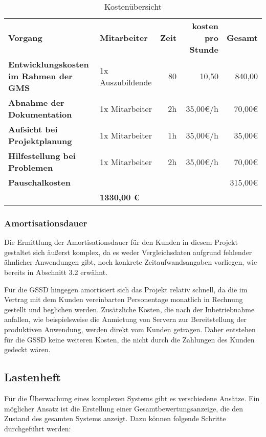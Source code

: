 \begin{flushleft}
	\begin{table}[h]
		\centering
		\begin{tabular}{ >{\bfseries}l l r r r }
			\rowcolor[HTML]{127017}
		\textbf{\color{white}Vorgang} & \textbf{\color{white}Mitarbeiter} & \textbf{\color{white}Zeit} & \textbf{\color{white}kosten pro Stunde} & \textbf{\color{white}Gesamt} \\
		Entwicklungskosten im Rahmen der GMS & 1x Auszubildende & 80 & 10,50 & 840,00 \\
		\rowcolor[HTML]{e1efd9}
		Abnahme der Dokumentation & 1x Mitarbeiter & 2h & 35,00€/h & 70,00€ \\
		Aufsicht bei Projektplanung & 1x Mitarbeiter & 1h & 35,00€/h & 35,00€ \\
		\rowcolor[HTML]{e1efd9}
		Hilfestellung bei Problemen & 1x Mitarbeiter & 2h & 35,00€/h & 70,00€ \\
		Pauschalkosten &  &  &  & 315,00€ \\
		\hline
		\rowcolor[HTML]{127017}
		\multicolumn{4}{r}{\textbf{\color{white}Gesamt}} & \textbf{\color{white}1330,00 €} \\
		\end{tabular}
		\caption{Kostenübersicht}
		\label{tab:kostenuebersicht}
		\end{table}
	\subsubsection{Amortisationsdauer}
	Die Ermittlung der Amortisationsdauer für den Kunden in diesem Projekt gestaltet sich äußerst komplex, da es weder Vergleichsdaten aufgrund fehlender ähnlicher Anwendungen gibt, noch konkrete Zeitaufwandsangaben vorliegen, wie bereits in Abschnitt 3.2 erwähnt.

	Für die \acs{GSSD} hingegen amortisiert sich das Projekt relativ schnell, da die im Vertrag mit dem Kunden vereinbarten Personentage monatlich in Rechnung gestellt und beglichen werden. Zusätzliche Kosten, die nach der Inbetriebnahme anfallen, wie beispielsweise die Anmietung von Servern zur Bereitstellung der produktiven Anwendung, werden direkt vom Kunden getragen. Daher entstehen für die \acs{GSSD} keine weiteren Kosten, die nicht durch die Zahlungen des Kunden gedeckt wären.
	\subsection{Lastenheft}
	Für die Überwachung eines komplexen Systems gibt es verschiedene Ansätze. Ein möglicher Ansatz ist die Erstellung einer Gesamtbewertungsanzeige, die den Zustand des gesamten Systems anzeigt. Dazu können folgende Schritte durchgeführt werden:


\end{flushleft}
